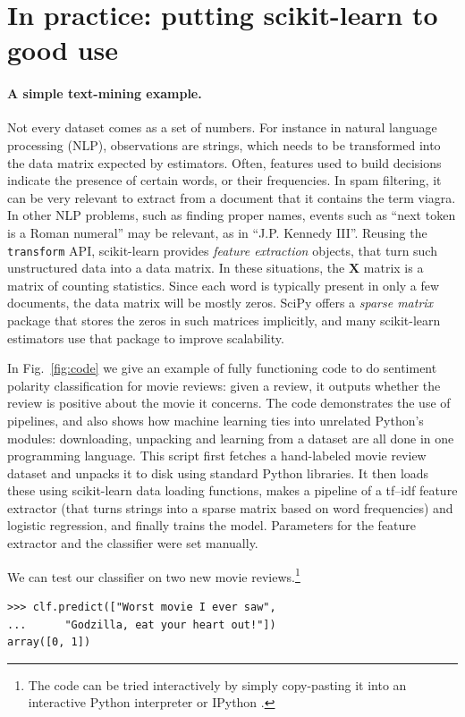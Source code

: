 \documentclass[a4paper]{article}
\begin{document}
\section{In practice: putting scikit-learn to good use}

\paragraph{A simple text-mining example.}
%
Not every dataset comes as a set of numbers. For instance in natural
language processing (NLP), observations are strings,
which needs to be transformed into the data matrix expected by
estimators. Often, features used to build decisions indicate the
presence of certain words, or their frequencies.
In spam filtering, it can be very relevant to extract from a document that
it contains the term \textsf{viagra}.
In other NLP problems, such as finding proper names,
events such as ``next token is a Roman numeral'' may be relevant, as in
``J.P. Kennedy III''.
Reusing the {\tt transform} API, scikit-learn
provides \emph{feature extraction} objects, that turn such
unstructured data into a data matrix. In these situations, the
$\textbf{X}$ matrix is a matrix of counting statistics.
Since each word is typically present in only a few documents,
the data matrix will be mostly zeros.
SciPy offers a \emph{sparse matrix} package
that stores the zeros in such matrices implicitly,
and many scikit-learn estimators use that package to improve scalability.

In Fig.~\ref{fig:code} we give an example of fully functioning code to
do sentiment polarity classification for movie reviews: given a review,
it outputs whether the review is positive about the movie it concerns.
The code demonstrates the use of pipelines, and also shows how machine
learning ties into unrelated Python's modules: downloading, unpacking and
learning from a dataset are all done in one programming language.
This script first fetches a hand-labeled movie review dataset
\cite{pang2004} and unpacks it to disk using standard Python libraries.
It then loads these using scikit-learn data loading functions, makes a
pipeline of a \textsf{tf--idf} feature extractor
\cite{rennie2003tackling} (that turns strings into a sparse matrix based
on word frequencies) and logistic regression, and finally trains the
model. Parameters for the feature extractor and the classifier
were set manually.

We can test our classifier on two new movie reviews.\footnote{
  The code can be tried interactively by simply copy-pasting it
  into an interactive Python interpreter or IPython \cite{perez2007ipython}.
}
\begin{lstlisting}
>>> clf.predict(["Worst movie I ever saw",
...      "Godzilla, eat your heart out!"])
array([0, 1])
\end{lstlisting}
\end{document}
